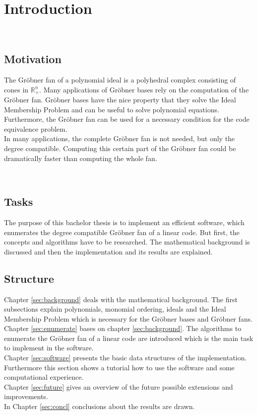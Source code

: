 \section{Introduction}

~\\
\subsection{Motivation}
The Gröbner fan of a polynomial ideal is a polyhedral complex consisting of cones in $\mathbb{R}_{+}^{n}$.
Many applications of Gröbner bases rely on the computation of the Gröbner fan.
Gröbner bases have the nice property that they solve the Ideal Membership Problem and can be useful to solve polynomial equations.
Furthermore, the Gröbner fan can be used for a necessary condition for the code equivalence problem. \\
In many applications, the complete Gröbner fan is not needed, but only the degree compatible. 
Computing this certain part of the Gröbner fan could be dramatically faster than computing the whole fan.

~\\

\subsection{Tasks}
The purpose of this bachelor thesis is to implement an efficient software, which enumerates the degree compatible Gröbner fan of a linear code. But first, the concepts and algorithms have to be researched. The mathematical background is discussed and then the implementation and its results are explained. 

\newpage

\subsection{Structure}
Chapter \ref{sec:background} deals with the mathematical background. The first subsections explain polynomials, monomial ordering, ideals and the Ideal Membership Problem which is necessary for the Gröbner bases and Gröbner fans. \\
Chapter \ref{sec:enumerate} bases on chapter \ref{sec:background}. The algorithms to enumerate the Gröbner fan of a linear code are introduced which is the main task to implement in the software.\\
Chapter \ref{sec:software} presents the basic data structures of the implementation. Furthermore this section shows a tutorial how to use the software and some computational experience.\\
Chapter \ref{sec:future} gives an overview of the future possible extensions and improvements.\\
In Chapter \ref{sec:concl} conclusions about the results are drawn.
\newpage